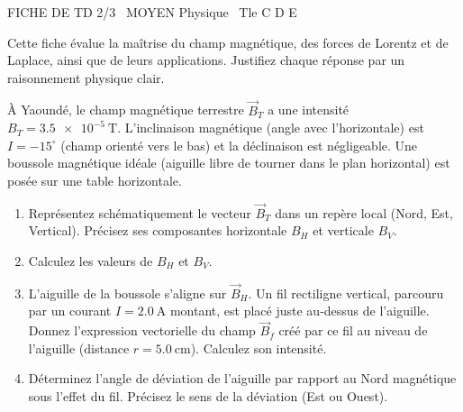 \documentclass[11pt]{article}
\begin{document}
\begin{tcolorbox}[enhanced,colback=popink,colframe=popink,arc=10pt,boxrule=0pt,left=12pt,right=12pt,top=9pt,bottom=9pt]
{\color{white}\popxbold\small FICHE DE TD 2/3 \textbullet\ MOYEN \hfill Physique \textbullet\ Tle C D E\par}
\end{tcolorbox}
\vspace{4pt}
Cette fiche évalue la maîtrise du champ magnétique, des forces de Lorentz et de Laplace, ainsi que de leurs applications. Justifiez chaque réponse par un raisonnement physique clair.

\begin{exercice}
À Yaoundé, le champ magnétique terrestre $\vec{B}_T$ a une intensité $B_T = \SI{3,5e-5}{\tesla}$. L'inclinaison magnétique (angle avec l'horizontale) est $I = -15^{\circ}$ (champ orienté vers le bas) et la déclinaison est négligeable. Une boussole magnétique idéale (aiguille libre de tourner dans le plan horizontal) est posée sur une table horizontale.
\begin{enumerate}
    \item Représentez schématiquement le vecteur $\vec{B}_T$ dans un repère local (Nord, Est, Vertical). Précisez ses composantes horizontale $B_H$ et verticale $B_V$.
    \item Calculez les valeurs de $B_H$ et $B_V$.
    \item L'aiguille de la boussole s'aligne sur $\vec{B}_H$. Un fil rectiligne vertical, parcouru par un courant $I = \SI{2,0}{\ampere}$ montant, est placé juste au-dessus de l'aiguille. Donnez l'expression vectorielle du champ $\vec{B}_f$ créé par ce fil au niveau de l'aiguille (distance $r = \SI{5,0}{\centi\meter}$). Calculez son intensité.
    \item Déterminez l'angle de déviation de l'aiguille par rapport au Nord magnétique sous l'effet du fil. Précisez le sens de la déviation (Est ou Ouest).
\end{enumerate}
\end{exercice}
\end{document}
